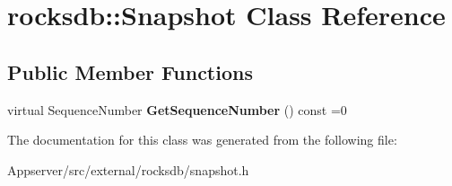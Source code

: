 \hypertarget{classrocksdb_1_1Snapshot}{}\section{rocksdb\+:\+:Snapshot Class Reference}
\label{classrocksdb_1_1Snapshot}
\subsection*{Public Member Functions}
\begin{DoxyCompactItemize}
\item 
virtual Sequence\+Number {\bfseries Get\+Sequence\+Number} () const =0\hypertarget{classrocksdb_1_1Snapshot_a6d2d75abc9fbc2f81b156d9246ac9d9b}{}\label{classrocksdb_1_1Snapshot_a6d2d75abc9fbc2f81b156d9246ac9d9b}

\end{DoxyCompactItemize}


The documentation for this class was generated from the following file\+:\begin{DoxyCompactItemize}
\item 
Appserver/src/external/rocksdb/snapshot.\+h\end{DoxyCompactItemize}
